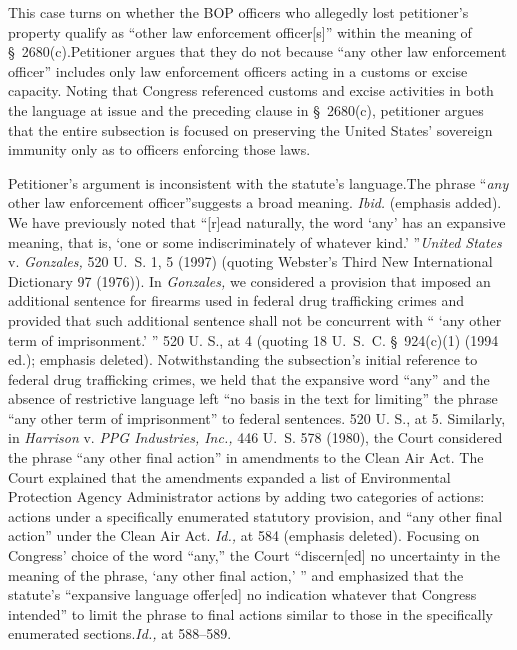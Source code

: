   This case turns on whether the BOP officers who allegedly lost petitioner's property qualify as ``other law enforcement officer[s]'' within the meaning of \S~2680(c).\footnotemark[2] Petitioner argues that they do not because ``any other law enforcement officer'' includes only law enforcement officers acting in a customs or excise capacity. Noting that Congress referenced customs and excise activities in both the language at issue and the preceding clause in \S~2680(c), petitioner argues that the entire subsection is focused on preserving the United States' sovereign immunity only as to officers enforcing those laws.

  Petitioner's argument is inconsistent with the statute's language.\footnotemark[3] The phrase ``\emph{any} other law enforcement officer''\starpage  suggests a broad meaning. \emph{Ibid.} (emphasis added). We have previously noted that ``[r]ead naturally, the word `any' has an expansive meaning, that is, ‘one or some indiscriminately of whatever kind.' ''\emph{United States} v. \emph{Gonzales,} 520 U.~S. 1, 5 (1997) (quoting Webster's Third New International Dictionary 97 (1976)). In \emph{Gonzales,} we considered a provision that imposed an additional sentence for firearms used in federal drug trafficking crimes and provided that such additional sentence shall not be concurrent with `` ‘any other term of imprisonment.' '' 520 U. S., at 4 (quoting 18 U.~S.~C. \S~924(c)(1) (1994 ed.); emphasis deleted). Notwithstanding the subsection's initial reference to federal drug trafficking crimes, we held that the expansive word ``any'' and the absence of restrictive language left ``no basis in the text for limiting'' the phrase ``any other term of imprisonment'' to federal sentences. 520 U. S., at 5. Similarly, in \emph{Harrison} v. \emph{PPG Industries, Inc.,} 446 U.~S. 578 (1980), the Court considered the phrase ``any other final action'' in amendments to the Clean Air Act. The Court explained that the amendments expanded a list of Environmental Protection Agency Administrator actions by adding two categories of actions: actions under a specifically enumerated statutory provision, and ``any other final action'' under the Clean Air Act. \emph{Id.,} at 584 (emphasis deleted). Focusing on Congress' choice of the word ``any,'' the Court ``discern[ed] no uncertainty in the meaning of the phrase, ‘any other final action,' '' and emphasized that the statute's ``expansive language offer[ed] no indi\starpage cation whatever that Congress intended'' to limit the phrase to final actions similar to those in the specifically enumerated sections.\emph{Id.,} at 588--589.

